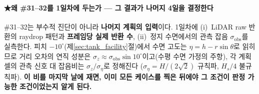\documentclass[11pt]{report}
\numberwithin{equation}{chapter}
\numberwithin{figure}{chapter}
\numberwithin{table}{chapter}
\begin{document}
\paragraph{★왜 \#31--32를 1일차에 두는가 --- 그 결과가 나머지 4일을 결정한다}
\#31--32는 부수적 진단이 아니라 \textbf{나머지 계획의 입력}이다. 1일차에
(i)~LiDAR raw 반환의 raydrop 패턴과 \textbf{프레임당 실제 반환 수},
(ii)~정지 수면에서의 관측 잡음 $\sigma_{\text{obs}}$를 실측한다.
피치 $-10^\circ$(제\ref{sec:tank_facility}절)에서 수면 고도는
$\eta = h - r\sin\theta$로 읽히므로 거리 오차의 연직 성분은
$\sigma_z \approx \sigma_{\text{obs}}\sin 10^\circ$이고(수평 수면 가정의 주항),
각 계획 셀의 관측 신호 대 잡음비는 $\sigma_z/\sigma_\eta$로 정해진다
($\sigma_\eta = H/(2\sqrt{2})$ 규칙파, $H_s/4$ 불규칙파).
\textbf{이 비를 마지막 날에 재면, 이미 모든 케이스를 찍은 뒤에야 그 조건이 판정 가능한
조건이었는지 알게 된다.}
\end{document}
